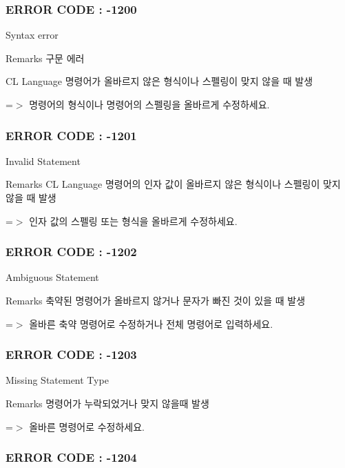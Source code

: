  \subsubsection*{E\-R\-R\-O\-R C\-O\-D\-E \-: -\/1200 }

Syntax error \begin{DoxyRemark}{Remarks}
구문 에러 \par
 C\-L Language 명령어가 올바르지 않은 형식이나 스펠링이 맞지 않을 때 발생 \par
 =$>$ 명령어의 형식이나 명령어의 스펠링을 올바르게 수정하세요.
\end{DoxyRemark}


 \subsubsection*{E\-R\-R\-O\-R C\-O\-D\-E \-: -\/1201 }

Invalid Statement \begin{DoxyRemark}{Remarks}
C\-L Language 명령어의 인자 값이 올바르지 않은 형식이나 스펠링이 맞지 않을 때 발생 \par
 =$>$ 인자 값의 스펠링 또는 형식을 올바르게 수정하세요.
\end{DoxyRemark}


 \subsubsection*{E\-R\-R\-O\-R C\-O\-D\-E \-: -\/1202 }

Ambiguous Statement \begin{DoxyRemark}{Remarks}
축약된 명령어가 올바르지 않거나 문자가 빠진 것이 있을 때 발생 \par
 =$>$ 올바른 축약 명령어로 수정하거나 전체 명령어로 입력하세요.
\end{DoxyRemark}


 \subsubsection*{E\-R\-R\-O\-R C\-O\-D\-E \-: -\/1203 }

Missing Statement Type \begin{DoxyRemark}{Remarks}
명령어가 누락되었거나 맞지 않을때 발생 \par
 =$>$ 올바른 명령어로 수정하세요.
\end{DoxyRemark}


 \subsubsection*{E\-R\-R\-O\-R C\-O\-D\-E \-: -\/1204 }

